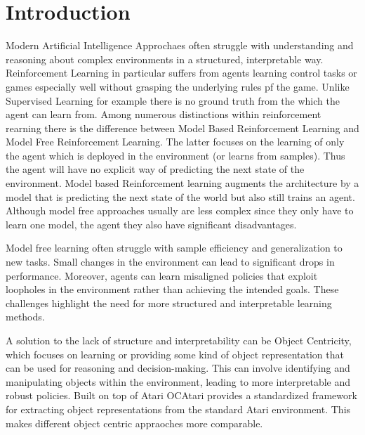 \documentclass[
	english,
	ruledheaders=section,
	class=report,
	thesis={type=master},
	accentcolor=9c,
	custommargins=true,
	marginpar=false,
	parskip=half-,
	fontsize=11pt,
]{tudapub}
\begin{document}
\chapter{Introduction}
\label{chap:introduction}

Modern Artificial Intelligence Approchaes often struggle with understanding and reasoning about complex 
environments in a structured, interpretable way. Reinforcement Learning in particular
suffers from agents learning control tasks or games especially well without grasping the underlying rules pf the game.
Unlike Supervised Learning for example there is no ground truth from the
which the agent can learn from. Among numerous distinctions within
reinforcement rearning there is the difference between Model Based
Reinforcement Learning and Model Free Reinforcement Learning. The latter
focuses on the learning of only the agent which is deployed in the environment
(or learns from samples). Thus the agent will have no explicit way of
predicting the next state of the environment. Model
based Reinforcement learning augments the architecture by a model that is
predicting the next state of the world but also still trains an agent. Although
model free approaches usually are less complex since they only have to learn
one model, the agent they also have significant disadvantages.

Model free learning often struggle with sample efficiency and
generalization to new tasks. Small changes in the environment can lead to
significant drops in performance. Moreover, agents can learn misaligned
policies that exploit loopholes in the environment rather than achieving the
intended goals. These challenges highlight the need for more structured and
interpretable learning methods. 

A solution to the lack of structure and interpretability can be Object Centricity, which focuses on learning or providing some kind of object representation that can be used for reasoning and decision-making. 
This can involve identifying and manipulating objects within the environment, leading to more interpretable and robust policies.
Built on top of Atari  OCAtari \cite{delfosse2023ocatari} provides a standardized framework for extracting object representations
from the standard Atari environment. This makes different object centric appraoches more comparable.
\end{document}
